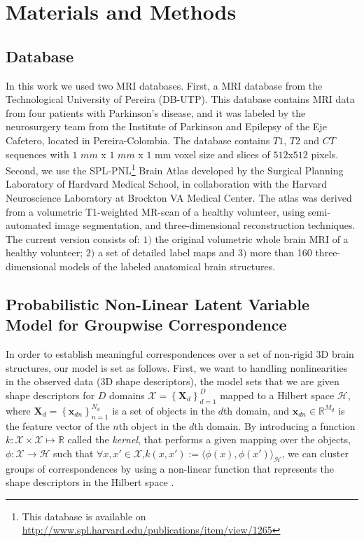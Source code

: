 \documentclass[twoside]{article}
\newcommand{\setObj}{\mathbf{X}_d}
\newcommand{\indobj}{\mathbf{x}_{dn}}
\newcommand{\mapphi}{\phi\left(x\right)}
\newcommand{\mapphit}{\phi\left(x'\right)}
\begin{document}
\section{Materials and Methods}\label{sec:method}

\subsection{Database}
In this work we used two MRI databases. First, a MRI database from the Technological University of Pereira (DB-UTP). This database contains MRI data from four patients with Parkinson's disease, and it was labeled by the neurosurgery team from the Institute of Parkinson and Epilepsy of the Eje Cafetero, located in Pereira-Colombia. The database contains $T1$, $T2$ and $CT$ sequences with $1$ $mm$ x $1$ $mm$ x $1$ mm voxel size and slices of
$512$x$512$ pixels. Second, we use the SPL-PNL\footnote{This database is available on  \url{http://www.spl.harvard.edu/publications/item/view/1265}} Brain Atlas developed by the Surgical Planning Laboratory of Hardvard Medical School, in collaboration with the Harvard Neuroscience Laboratory at Brockton VA Medical
Center. The atlas was derived from a volumetric T1-weighted MR-scan of
a healthy volunteer, using semi-automated image segmentation, and
three-dimensional reconstruction techniques. The current version
consists of: $1)$ the original volumetric whole brain MRI of a healthy
volunteer; $2)$ a set of detailed label maps and $3)$ more than 160 three-dimensional models of the labeled anatomical brain structures.

\subsection{Probabilistic Non-Linear Latent Variable Model for Groupwise Correspondence}

In order to establish meaningful correspondences over a set of non-rigid 3D brain structures, our model is set as follows. First, we want to handling nonlinearities in the observed data (3D shape descriptors), the model sets that we are given shape descriptors for $D$ domains $\mathcal{X}=\left\{\setObj\right\}_{d=1}^D$ mapped to a Hilbert space $\mathcal{H}$, where $\setObj = \left\{\indobj\right\}_{n=1}^{N_d}$ is a set of objects in the $d$th domain, and $\indobj \in \mathbb{R}^{M_d}$ is  the feature vector of the $n$th object in the $d$th domain. By introducing a function $k:\mathcal{X}\times\mathcal{X}\mapsto \mathbb{R}$ called the \textit{kernel}, that performs a given mapping over the objects, $\phi : \mathcal{X}\to\mathcal{H}$ such that $\forall x,x' \in \mathcal{X}$,$ k\left(x,x'\right) := \langle\mapphi,\mapphit\rangle_{\mathcal{H}}$, we can cluster groups of correspondences by using a non-linear function that represents the shape descriptors in the Hilbert space \cite{Sriperumbudur10}. 
\end{document}
